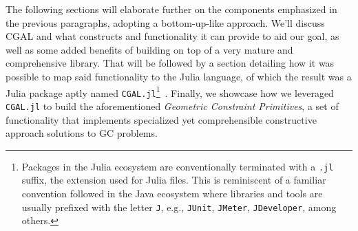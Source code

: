 The following sections will elaborate further on the components emphasized in
the previous paragraphs, adopting a bottom-up-like approach.  We'll discuss
\ac{CGAL} and what constructs and functionality it can provide to aid our goal,
as well as some added benefits of building on top of a very mature and
comprehensive library.  That will be followed by a section detailing how it was
possible to map said functionality to the Julia language, of which the result
was a Julia package aptly named \texttt{CGAL.jl}\footnote{Packages in the Julia
ecosystem are conventionally terminated with a \texttt{.jl} suffix, the
extension used for Julia files.  This is reminiscent of a familiar convention
followed in the Java ecosystem where libraries and tools are usually prefixed
with the letter \texttt{J}, e.g., \texttt{JUnit}, \texttt{JMeter},
\texttt{JDeveloper}, among others.}~\cite{Ventura:2019:CGAL.jl}.  Finally, we
showcase how we leveraged \texttt{CGAL.jl} to build the aforementioned
\textit{Geometric Constraint Primitives}, a set of functionality that implements
specialized yet comprehensible constructive approach solutions to \ac{GC}
problems.

% 
% 
% 
